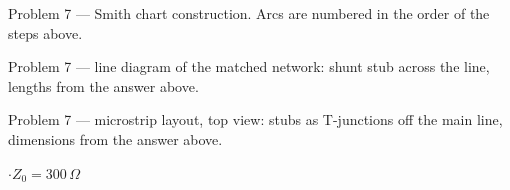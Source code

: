 {\footnotesize\color{sub} Problem 7 --- Smith chart construction. Arcs are numbered in the order of the steps above.}

{\footnotesize\color{sub} Problem 7 --- line diagram of the matched network: shunt stub across the line, lengths from the answer above.}

{\footnotesize\color{sub} Problem 7 --- microstrip layout, top view: stubs as T-junctions off the main line, dimensions from the answer above.}

\vspace{2pt}

{\color{sub}\footnotesize {} \gap$\cdot$\gap $Z_0 = 300\,\Omega$}


